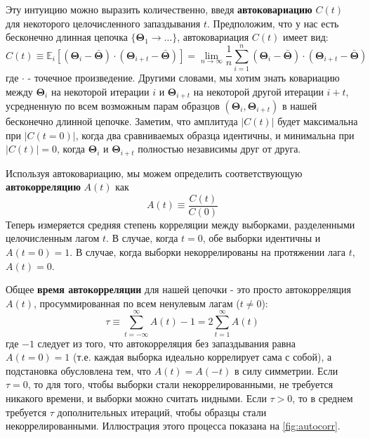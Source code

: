 \documentclass[12pt, titlepage]{article}
\newcommand{\meanwrt}[2]{\ensuremath{\mathbb{E}_{{#2}}\left[{#1}\right]}}
\newcommand{\params}{\ensuremath{\boldsymbol\Theta}}
\begin{document}
Эту интуицию можно выразить количественно, введя \textbf{автоковариацию} $C(t)$ для некоторого целочисленного запаздывания $t$. Предположим, что у нас есть бесконечно длинная цепочка $\{ \params_{1} \rightarrow \dots \}$, автоковариация $C(t)$ имеет вид:
\begin{equation}
    C(t) \equiv \meanwrt{(\params_{i} - \bar{\params})
    \cdot (\params_{i+t} - \bar{\params})}{i}
    = \lim_{n\rightarrow\infty} \frac{1}{n}
    \sum_{i=1}^{n} (\params_{i} - \bar{\params}) \cdot (\params_{i+t} - \bar{\params})
\end{equation}
где $\cdot$ - точечное произведение. Другими словами, мы хотим знать ковариацию между $\params_i$ на некоторой итерации $i$ и $\params_{i+t}$ на некоторой другой итерации $i+t$, усредненную по всем возможным парам образцов $(\params_i, \params_{i+t})$ в нашей бесконечно длинной цепочке. Заметим, что амплитуда $|C(t)|$ будет максимальна при $|C(t=0)|$, когда два сравниваемых образца идентичны, и минимальна при $|C(t)|=0$, когда $\params_{i}$ и $\params_{i+t}$ полностью независимы друг от друга.

Используя автоковариацию, мы можем определить соответствующую \textbf{автокорреляцию} $A(t)$ как
\begin{equation}
    A(t) \equiv \frac{C(t)}{C(0)}
\end{equation}
Теперь измеряется средняя степень корреляции между выборками, разделенными целочисленным лагом $t$. В случае, когда $t=0$, обе выборки идентичны и $A(t=0) = 1$. В случае, когда выборки некоррелированы на протяжении лага $t$, $A(t) = 0$.

Общее \textbf{время автокорреляции} для нашей цепочки - это просто автокорреляция $A(t)$, просуммированная по всем ненулевым лагам ($t \neq 0$):
\begin{equation}
    \tau \equiv \sum_{t=-\infty}^{\infty} A(t) - 1
    = 2 \sum_{t=1}^{\infty} A(t)
\end{equation}
где $-1$ следует из того, что автокорреляция без запаздывания равна $A(t=0) = 1$ (т.е. каждая выборка идеально коррелирует сама с собой), а подстановка обусловлена тем, что $A(t) = A(-t)$ в силу симметрии. Если $\tau = 0$, то для того, чтобы выборки стали некоррелированными, не требуется никакого времени, и выборки можно считать иидными. Если $\tau > 0$, то в среднем требуется $\tau$ дополнительных итераций, чтобы образцы стали некоррелированными. Иллюстрация этого процесса показана на {\color{red} \autoref{fig:autocorr}}.
\end{document}
